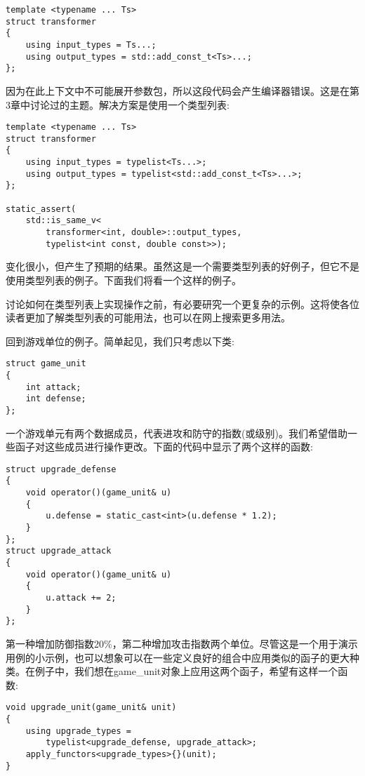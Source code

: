 \begin{lstlisting}[style=styleCXX]
template <typename ... Ts>
struct transformer
{
	using input_types = Ts...;
	using output_types = std::add_const_t<Ts>...;
};
\end{lstlisting}

因为在此上下文中不可能展开参数包，所以这段代码会产生编译器错误。这是在第3章中讨论过的主题。解决方案是使用一个类型列表:

\begin{lstlisting}[style=styleCXX]
template <typename ... Ts>
struct transformer
{
	using input_types = typelist<Ts...>;
	using output_types = typelist<std::add_const_t<Ts>...>;
};

static_assert(
	std::is_same_v<
		transformer<int, double>::output_types,
		typelist<int const, double const>>);
\end{lstlisting}

变化很小，但产生了预期的结果。虽然这是一个需要类型列表的好例子，但它不是使用类型列表的例子。下面我们将看一个这样的例子。


讨论如何在类型列表上实现操作之前，有必要研究一个更复杂的示例。这将使各位读者更加了解类型列表的可能用法，也可以在网上搜索更多用法。

回到游戏单位的例子。简单起见，我们只考虑以下类:

\begin{lstlisting}[style=styleCXX]
struct game_unit
{
	int attack;
	int defense;
};
\end{lstlisting}

一个游戏单元有两个数据成员，代表进攻和防守的指数(或级别)。我们希望借助一些函子对这些成员进行操作更改。下面的代码中显示了两个这样的函数:

\begin{lstlisting}[style=styleCXX]
struct upgrade_defense
{
	void operator()(game_unit& u)
	{
		u.defense = static_cast<int>(u.defense * 1.2);
	}
};
struct upgrade_attack
{
	void operator()(game_unit& u)
	{
		u.attack += 2;
	}
};
\end{lstlisting}

第一种增加防御指数20\%，第二种增加攻击指数两个单位。尽管这是一个用于演示用例的小示例，也可以想象可以在一些定义良好的组合中应用类似的函子的更大种类。在例子中，我们想在game\_unit对象上应用这两个函子，希望有这样一个函数:

\begin{lstlisting}[style=styleCXX]
void upgrade_unit(game_unit& unit)
{
	using upgrade_types =
		typelist<upgrade_defense, upgrade_attack>;
	apply_functors<upgrade_types>{}(unit);
}
\end{lstlisting}

